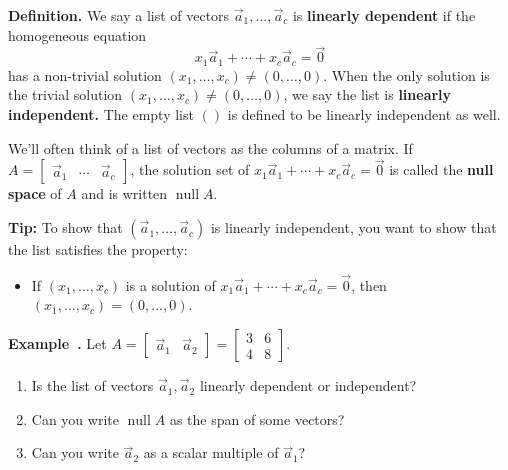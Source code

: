\documentclass[11pt, letterpaper]{report}
\newenvironment{notes}{}{}
\newcounter{example}[section]
\newcommand{\example}{\refstepcounter{example}%
\par\noindent\textbf{Example~\theexample.} }
\newenvironment{definition}{\begin{bbox}\par\noindent\textbf{Definition. }}
  {\end{bbox}}
\newlength\oldfboxsep%
\newlength\myminiwidth%
\newenvironment{bbox}{%
  \setlength\oldfboxsep\fboxsep
  \setlength{\fboxsep}{.1in}%
  \setlength\myminiwidth\linewidth%
  \addtolength\myminiwidth{-0.2in}%
  \vspace{0.1in}%
  \begin{lrbox}{\bboxbox}\begin{minipage}{\myminiwidth}%
    }{%
    \end{minipage}\end{lrbox}%
  \noindent\fbox{\usebox{\bboxbox}}\vspace{0.1in}\setlength\fboxsep\oldfboxsep%
}
\DeclareMathOperator{\nul}{null}
\begin{document}
\begin{definition}  
We say a list of vectors $\vec{a}_1,\ldots,\vec{a}_c$ is \textbf{linearly dependent} if the homogeneous equation
\[ x_1 \vec{a}_1 + \cdots + x_c\vec{a}_c = \vec{0}\]
has a non-trivial solution $(x_1,\ldots, x_c) \ne (0,\ldots,0)$. When the only solution is the trivial solution $(x_1,\ldots, x_c) \ne (0,\ldots,0)$, we say the list is \textbf{linearly independent.} The empty list $()$ is defined to be linearly independent as well.

We'll often think of a list of vectors as the columns of a matrix. If $A =
\begin{bmatrix}
\vec{a}_1 & \cdots & \vec{a}_c
\end{bmatrix}
$, the solution set of $ x_1 \vec{a}_1 + \cdots + x_c\vec{a}_c = \vec{0}$ is called the \textbf{null space} of $A$ and is written $\nul A$.

\textbf{Tip:} To show that $(\vec{a}_1,\ldots,\vec{a}_c)$ is linearly independent, you want to show that the list satisfies the property:
\begin{itemize}
\item If $(x_1,\ldots,x_c)$ is a solution of $x_1\vec{a}_1+\cdots + x_c\vec{a}_c = \vec{0}$, then $(x_1,\ldots,x_c) = (0,\ldots,0)$.
\end{itemize}
\end{definition}

\example \label{example:1.4independence-b} Let $A = \begin{bmatrix}
\vec{a}_1 & \vec{a}_2
\end{bmatrix} = \begin{bmatrix}
3 & 6 \\
4 & 8
\end{bmatrix}$.
\begin{enumerate}[label=(\alph*)]
\item Is the list of vectors $\vec{a}_1, \vec{a}_2$ linearly dependent or independent?
\item Can you write $\nul A$ as the span of some vectors?
\item Can you write $\vec{a}_2$ as a scalar multiple of $\vec{a}_1$?
\end{enumerate}

\begin{notes}
\vfill
\end{notes}
\end{document}
